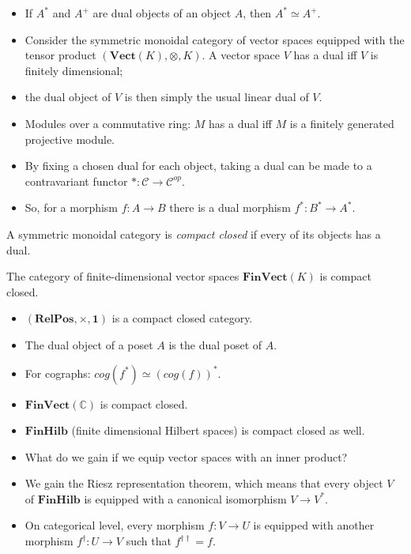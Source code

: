\documentclass{beamer}
\newcommand{\C}{\mathcal{C}}
\newcommand{\Vect}{\mathbf{Vect}}
\newcommand{\FinVect}{\mathbf{FinVect}}
\newcommand{\FinHilb}{\mathbf{FinHilb}}
\newcommand{\RelPos}{\mathbf{RelPos}}
\begin{document}
\begin{frame}
\begin{itemize}
\item If $A^*$ and $A^+$ are dual objects of an object $A$, then $A^*\simeq A^+$.\pause
\item Consider the symmetric monoidal category of vector spaces 
equipped with the tensor product $(\Vect(K),\otimes,K)$. A vector space $V$ has
a dual iff $V$ is finitely dimensional;\pause
\item the dual object of $V$ is then simply the usual linear dual of $V$.\pause
\item Modules over a commutative ring: $M$ has a dual iff $M$ is a finitely generated
projective module.\pause
\item By fixing a chosen dual for each object, taking a dual can be made to a
contravariant functor $*\colon\C\to\C^{op}$.\pause
\item So, for a morphism $f\colon A\to B$ there is a dual morphism $f^*\colon B^*\to
A^*$.\pause
\end{itemize}
\end{frame}


\begin{frame}
\begin{definition}
A symmetric monoidal category is {\em compact closed}
if every of its objects has a dual.
\end{definition}

The category of finite-dimensional vector spaces $\FinVect(K)$ is compact closed.
\end{frame}
\begin{frame}
\begin{theorem}
\begin{itemize}
\item
$(\RelPos,\times,\mathbf 1)$ is a compact closed category. 
\item The dual object of a poset $A$
is the dual poset of $A$.
\item For cographs: $cog(f^*)\simeq (cog(f))^*$.
\end{itemize}
\end{theorem}
\end{frame}
\begin{frame}
\begin{itemize}
\item $\FinVect(\mathbb C)$ is compact closed.\pause
\item $\FinHilb$ (finite dimensional Hilbert spaces) is compact closed as well.\pause
\item What do we gain if we equip vector spaces with an inner product?\pause
\item We gain the Riesz representation theorem, which means that every object $V$ of
$\FinHilb$ is equipped with a canonical isomorphism $V\to V^*$.\pause
\item On categorical level, every morphism $f\colon V\to U$ is equipped with
another morphism $f^\dag\colon U\to V$ such that $f^{\dag\dag}=f$.
\end{itemize}
\end{frame}
 
\end{document}
